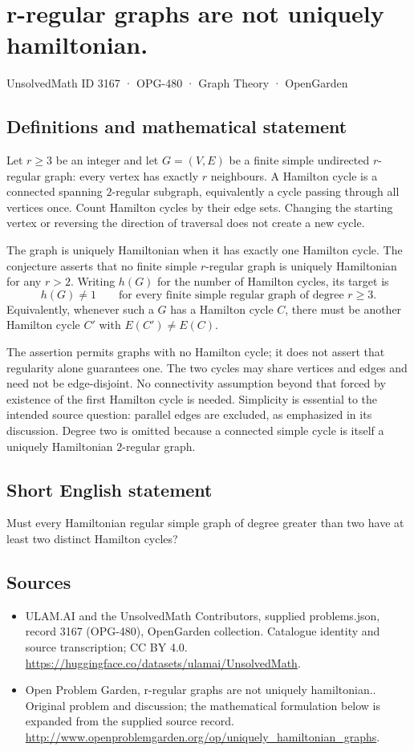 \documentclass[11pt,a4paper]{article}
\begin{document}
\section*{r-regular graphs are not uniquely hamiltonian.}\label{3167}
{\small UnsolvedMath ID 3167 · OPG-480 · Graph Theory · OpenGarden}
\subsection{Definitions and mathematical statement}
Let $r\geq3$ be an integer and let $G=(V,E)$ be a finite simple
undirected $r$-regular graph: every vertex has exactly $r$
neighbours. A Hamilton cycle is a connected spanning
$2$-regular subgraph, equivalently a cycle passing through
all vertices once. Count Hamilton cycles by their edge sets.
Changing the starting vertex or reversing the direction of
traversal does not create a new cycle.

The graph is uniquely Hamiltonian when it has exactly one
Hamilton cycle. The conjecture asserts that no finite simple
$r$-regular graph is uniquely Hamiltonian for any $r>2$.
Writing $h(G)$ for the number of Hamilton cycles, its target
is
\[
 h(G)\neq1\qquad
 \text{for every finite simple regular graph of degree }r\geq3.
\]
Equivalently, whenever such a $G$ has a Hamilton cycle $C$,
there must be another Hamilton cycle $C'$ with
$E(C')\neq E(C)$.

The assertion permits graphs with no Hamilton cycle; it
does not assert that regularity alone guarantees one. The
two cycles may share vertices and edges and need not be
edge-disjoint. No connectivity assumption beyond that
forced by existence of the first Hamilton cycle is needed.
Simplicity is essential to the intended source question:
parallel edges are excluded, as emphasized in its discussion.
Degree two is omitted because a connected simple cycle is
itself a uniquely Hamiltonian $2$-regular graph.
\subsection{Short English statement}
Must every Hamiltonian regular simple graph of degree greater than two have at least two distinct Hamilton cycles?
\subsection{Sources}
\begin{itemize}
\item[S1] ULAM.AI and the UnsolvedMath Contributors, supplied problems.json, record 3167 (OPG-480), OpenGarden collection. Catalogue identity and source transcription; CC BY 4.0.
\url{https://huggingface.co/datasets/ulamai/UnsolvedMath}.
\item[S2] Open Problem Garden, r-regular graphs are not uniquely hamiltonian.. Original problem and discussion; the mathematical formulation below is expanded from the supplied source record.
\url{http://www.openproblemgarden.org/op/uniquely_hamiltonian_graphs}.
\end{itemize}
\end{document}
